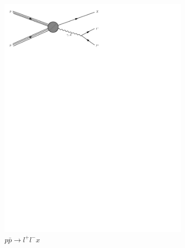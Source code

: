 \begin{figure}[h]
\begin{subfigure}[b]{0.3\textwidth}
    \includegraphics[trim={0.5cm 22cm 10cm 0cm},width=\textwidth]{../Diagrams/D4.pdf}
    \caption{$p\bar{p}\rightarrow l^+l^-x$}
    \label{fey:4}
  \end{subfigure}%
  ~
  \begin{subfigure}[b]{0.3\textwidth}

\end{subfigure}
\end{figure}
